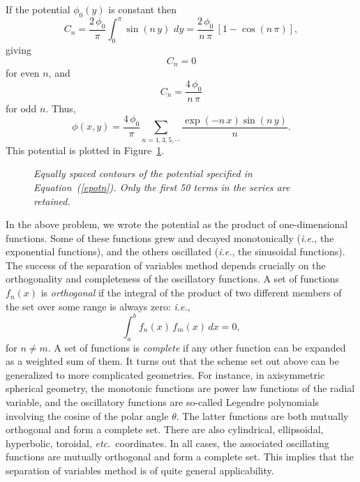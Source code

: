 If the potential $\phi_0(y)$ is constant then
\begin{equation}
C_n = \frac{2\,\phi_0}{\pi} \int_0^\pi \sin (n\,y)\,\,dy
= \frac{2\,\phi_0}{n \,\pi}\, [1- \cos (n\,\pi) ],
\end{equation}
giving
\begin{equation}
C_n = 0
\end{equation}
for even $n$, and
\begin{equation}
C_n = \frac{4\,\phi_0}{n \,\pi}
\end{equation}
for odd $n$. Thus,
\begin{equation}\label{epotn}
\phi(x, y) = \frac{4\,\phi_0}{\pi}\sum_{n=1, 3, 5,\cdots}\frac{\exp(-n\,x)\sin (n\,y)}{n}.
\end{equation}
This potential is plotted in Figure~\ref{fex5}.
\begin{figure}
\epsfysize=3in
\centerline{}
\caption{\em Equally spaced contours of the potential specified in Equation~(\ref{epotn}). Only the first 50 terms in the series are retained.}\label{fex5}
\end{figure}


In the above problem, we wrote the potential as the product of one-dimensional
functions. Some of these functions grew and decayed monotonically ({\em i.e.}, the
exponential functions), and the others oscillated ({\em i.e.}, the sinusoidal functions).
The success of the separation of variables method depends crucially on the orthogonality and completeness
of the oscillatory functions. A set of functions $f_n(x)$ is {\em orthogonal}\/
if the integral of the product of two different members of the set over some
range is always zero: {\em i.e.}, 
\begin{equation}
\int_a^b f_n(x) \,f_m(x)\, dx = 0,
\end{equation}
for $n\neq m$. A set of functions is {\em complete}\/ if any other function can be
expanded as a weighted sum of them. It turns out that the scheme set out
above can be generalized to more complicated geometries. 
For instance,  in axisymmetric spherical geometry, the monotonic
functions are power law functions of the radial variable, and the oscillatory functions
are so-called Legendre polynomials involving the cosine of the polar angle $\theta$. The latter functions are both mutually orthogonal and form a
complete set. There are also cylindrical, ellipsoidal, hyperbolic, toroidal, {\em etc.}\
coordinates. In all cases, the associated oscillating functions are mutually
orthogonal
and form a complete set. This implies that the separation of variables method
is of quite general applicability. 


